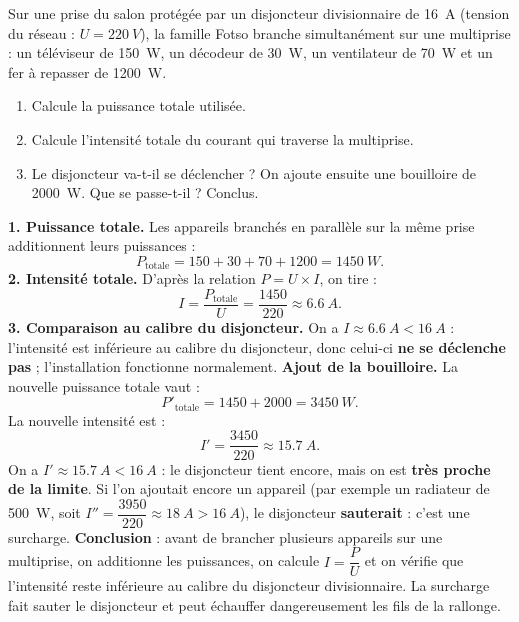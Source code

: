 \documentclass[11pt]{article}
\begin{document}
\begin{exoresolu}
Sur une prise du salon protégée par un disjoncteur divisionnaire de \SI{16}{A} (tension du réseau : $U = \SI{220}{V}$), la famille Fotso branche simultanément sur une multiprise : un téléviseur de \SI{150}{W}, un décodeur de \SI{30}{W}, un ventilateur de \SI{70}{W} et un fer à repasser de \SI{1200}{W}.
\begin{enumerate}
\item Calcule la puissance totale utilisée.
\item Calcule l'intensité totale du courant qui traverse la multiprise.
\item Le disjoncteur va-t-il se déclencher ? On ajoute ensuite une bouilloire de \SI{2000}{W}. Que se passe-t-il ? Conclus.
\end{enumerate}
\tcblower
\textbf{1. Puissance totale.} Les appareils branchés en parallèle sur la même prise additionnent leurs puissances :
\[ P_{\text{totale}} = 150 + 30 + 70 + 1200 = \SI{1450}{W}. \]
\textbf{2. Intensité totale.} D'après la relation $P = U \times I$, on tire :
\[ I = \dfrac{P_{\text{totale}}}{U} = \dfrac{1450}{220} \approx \SI{6,6}{A}. \]
\textbf{3. Comparaison au calibre du disjoncteur.} On a $I \approx \SI{6,6}{A} < \SI{16}{A}$ : l'intensité est inférieure au calibre du disjoncteur, donc celui-ci \textbf{ne se déclenche pas} ; l'installation fonctionne normalement.
\textbf{Ajout de la bouilloire.} La nouvelle puissance totale vaut :
\[ P'_{\text{totale}} = 1450 + 2000 = \SI{3450}{W}. \]
La nouvelle intensité est :
\[ I' = \dfrac{3450}{220} \approx \SI{15,7}{A}. \]
On a $I' \approx \SI{15,7}{A} < \SI{16}{A}$ : le disjoncteur tient encore, mais on est \textbf{très proche de la limite}. Si l'on ajoutait encore un appareil (par exemple un radiateur de \SI{500}{W}, soit $I'' = \dfrac{3950}{220} \approx \SI{18}{A} > \SI{16}{A}$), le disjoncteur \textbf{sauterait} : c'est une surcharge.
\textbf{Conclusion} : avant de brancher plusieurs appareils sur une multiprise, on additionne les puissances, on calcule $I = \dfrac{P}{U}$ et on vérifie que l'intensité reste inférieure au calibre du disjoncteur divisionnaire. La surcharge fait sauter le disjoncteur et peut échauffer dangereusement les fils de la rallonge.
\end{exoresolu}
\end{document}
